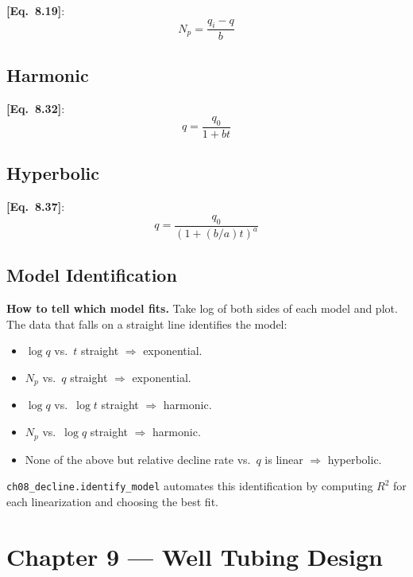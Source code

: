 \documentclass[11pt,a4paper,openany]{book}
\newcommand{\eqrefbook}[1]{\textcolor{blue!60!black}{\textbf{[Eq.~#1]}}}
\newcommand{\code}[1]{\texttt{#1}}
\begin{document}
\eqrefbook{8.19}:
\begin{equation}
  N_p = \frac{q_i - q}{b}
\end{equation}

\section{Harmonic}

\eqrefbook{8.32}:
\begin{equation}
  q = \frac{q_0}{1 + bt}
\end{equation}

\section{Hyperbolic}

\eqrefbook{8.37}:
\begin{equation}
  q = \frac{q_0}{(1 + (b/a)t)^a}
\end{equation}

\section{Model Identification}

\begin{theory}
\textbf{How to tell which model fits.} Take log of both sides of each
model and plot. The data that falls on a straight line identifies the
model:
\begin{itemize}
  \item $\log q$ vs.\ $t$ straight $\Rightarrow$ exponential.
  \item $N_p$ vs.\ $q$ straight $\Rightarrow$ exponential.
  \item $\log q$ vs.\ $\log t$ straight $\Rightarrow$ harmonic.
  \item $N_p$ vs.\ $\log q$ straight $\Rightarrow$ harmonic.
  \item None of the above but relative decline rate vs.\ $q$ is
        linear $\Rightarrow$ hyperbolic.
\end{itemize}
\end{theory}

\begin{implbox}
\code{ch08\_decline.identify\_model} automates this identification by
computing $R^2$ for each linearization and choosing the best fit.
\end{implbox}

\chapter{Chapter 9 — Well Tubing Design}
\end{document}
